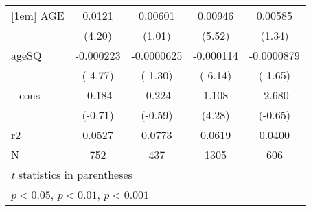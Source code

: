 \begin{table}[htbp]
\begin{tabular}{l*{4}{c}}
[1em]
AGE         &      0.0121\sym{***}&     0.00601         &     0.00946\sym{***}&     0.00585         \\
            &      (4.20)         &      (1.01)         &      (5.52)         &      (1.34)         \\
[1em]
ageSQ       &   -0.000223\sym{***}&  -0.0000625         &   -0.000114\sym{***}&  -0.0000879         \\
            &     (-4.77)         &     (-1.30)         &     (-6.14)         &     (-1.65)         \\
[1em]
\_cons      &      -0.184         &      -0.224         &       1.108\sym{***}&      -2.680         \\
            &     (-0.71)         &     (-0.59)         &      (4.28)         &     (-0.65)         \\
\hline
r2          &      0.0527         &      0.0773         &      0.0619         &      0.0400         \\
N           &         752         &         437         &        1305         &         606         \\
\hline\hline
\multicolumn{5}{l}{\footnotesize \textit{t} statistics in parentheses}\\
\multicolumn{5}{l}{\footnotesize \sym{*} \(p<0.05\), \sym{**} \(p<0.01\), \sym{***} \(p<0.001\)}\\
\end{tabular}
\end{table}
